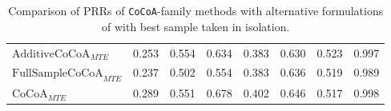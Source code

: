 \begin{table*}[h!]
\begin{tabular}{lrrrrrrr}
\midrule

$\text{AdditiveCoCoA}_{MTE}$ & 0.253& 0.554& 0.634& 0.383& 0.630& 0.523& 0.997\\
$\text{FullSampleCoCoA}_{MTE}$ & 0.237& 0.502& 0.554& 0.383& 0.636& 0.519& 0.989\\
$\text{CoCoA}_{MTE}$ & 0.289& 0.551& 0.678& 0.402& 0.646& 0.517& 0.998\\
\bottomrule

\end{tabular}
\caption{Comparison of PRRs of \texttt{CoCoA}-family methods with alternative formulations of with best sample taken in isolation.}
\label{tab:ablation_cocoa_best}
\end{table*}
